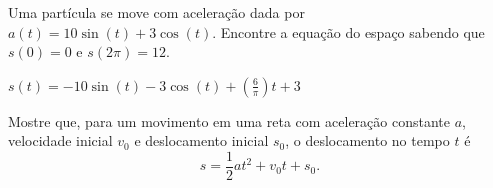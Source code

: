 \begin{exercises}
\begin{exercise}
  Uma partícula se move com aceleração dada por $a(t)= 10 \sin(t)+ 3 \cos(t)$.
  Encontre a equação do espaço sabendo que $s(0)=0$ e $s(2\pi)=12$.
  \begin{answer}
    \(s(t)=-10\sin(t)-3\cos(t)+ (\frac{6}{\pi})t+3\)
  \end{answer}
\end{exercise}

\begin{exercise}
  Mostre que, para um movimento em uma reta com aceleração constante $a$,
  velocidade inicial $v_0$ e deslocamento inicial $s_0$, o deslocamento no tempo
  $t$ é
  \[
    s = \frac{1}{2}at^2 + v_0t + s_0 .
  \]
\end{exercise}



\end{exercises}
